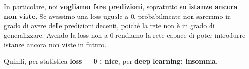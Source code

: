 In particolare, noi \textbf{vogliamo fare predizioni}, sopratutto su
\textbf{istanze ancora non viste.} Se avessimo una loss uguale a 0,
probabilmente non saremmo in grado di avere delle predizioni decenti, poiché la
rete non è in grado di generalizzare. Avendo la loss non a 0 rendiamo la rete
capace di poter introdurre istanze ancora non viste in futuro.

Quindi, per statistica \textbf{loss = 0 : nice}, per \textbf{deep learning:
    insomma}.

